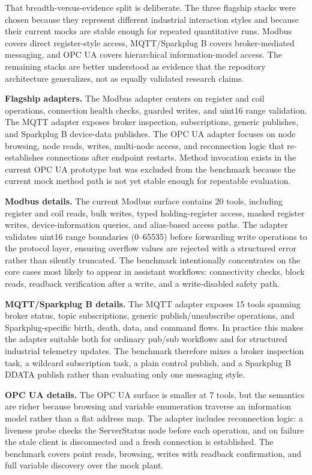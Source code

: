 \documentclass[conference]{IEEEtran}
\newcommand{\modbusToolCount}{20}
\newcommand{\mqttToolCount}{15}
\newcommand{\opcuaToolCount}{7}
\begin{document}
That breadth-versus-evidence split is deliberate. The three flagship stacks were chosen because they represent different industrial interaction styles and because their current mocks are stable enough for repeated quantitative runs. Modbus covers direct register-style access, MQTT/Sparkplug B covers broker-mediated messaging, and OPC UA covers hierarchical information-model access. The remaining stacks are better understood as evidence that the repository architecture generalizes, not as equally validated research claims.

\textbf{Flagship adapters.} The Modbus adapter centers on register and coil operations, connection health checks, guarded writes, and uint16 range validation. The MQTT adapter exposes broker inspection, subscriptions, generic publishes, and Sparkplug B device-data publishes. The OPC UA adapter focuses on node browsing, node reads, writes, multi-node access, and reconnection logic that re-establishes connections after endpoint restarts. Method invocation exists in the current OPC UA prototype but was excluded from the benchmark because the current mock method path is not yet stable enough for repeatable evaluation.

\textbf{Modbus details.} The current Modbus surface contains \modbusToolCount{} tools, including register and coil reads, bulk writes, typed holding-register access, masked register writes, device-information queries, and alias-based access paths. The adapter validates uint16 range boundaries (0--65535) before forwarding write operations to the protocol layer, ensuring overflow values are rejected with a structured error rather than silently truncated. The benchmark intentionally concentrates on the core cases most likely to appear in assistant workflows: connectivity checks, block reads, readback verification after a write, and a write-disabled safety path.

\textbf{MQTT/Sparkplug B details.} The MQTT adapter exposes \mqttToolCount{} tools spanning broker status, topic subscriptions, generic publish/unsubscribe operations, and Sparkplug-specific birth, death, data, and command flows. In practice this makes the adapter suitable both for ordinary pub/sub workflows and for structured industrial telemetry updates. The benchmark therefore mixes a broker inspection task, a wildcard subscription task, a plain control publish, and a Sparkplug B DDATA publish rather than evaluating only one messaging style.

\textbf{OPC UA details.} The OPC UA surface is smaller at \opcuaToolCount{} tools, but the semantics are richer because browsing and variable enumeration traverse an information model rather than a flat address map. The adapter includes reconnection logic: a liveness probe checks the ServerStatus node before each operation, and on failure the stale client is disconnected and a fresh connection is established. The benchmark covers point reads, browsing, writes with readback confirmation, and full variable discovery over the mock plant.
\end{document}
